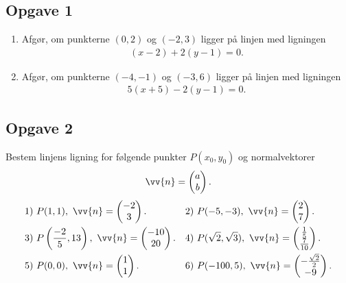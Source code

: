 \subsection*{Opgave 1}
\begin{enumerate}[label=\roman*)]
\item Afgør, om punkterne $(0,2)$ og $(-2,3)$ ligger på linjen med ligningen
\begin{align*}
	(x-2) + 2(y-1) = 0.
\end{align*}
\item Afgør, om punkterne $(-4,-1)$ og $(-3,6)$ ligger på linjen med ligningen 
\begin{align*}
	5(x+5) - 2(y-1) = 0.
\end{align*}
\end{enumerate}

\subsection*{Opgave 2}
Bestem linjens ligning for følgende punkter $P(x_0,y_0)$ og normalvektorer $$\vv{n} = \begin{pmatrix}
a \\ b
\end{pmatrix}.$$
\begin{align*}
&1) \ P(1,1), \ \vv{n} = \begin{pmatrix}
-2 \\ 3
\end{pmatrix}.   &&2) \ P(-5,-3), \ \vv{n} = \begin{pmatrix}
2 \\ 7
\end{pmatrix}.    \\
&3) \ P\left(\frac{-2}{5},13\right), \ \vv{n} = \begin{pmatrix}
-10 \\ 20
\end{pmatrix}.   &&4) \ P(\sqrt{2},\sqrt{3}), \ \vv{n} = \begin{pmatrix}
\frac{1}{5} \\ \frac{7}{10}
\end{pmatrix}.   \\
&5) \ P(0,0), \ \vv{n} = \begin{pmatrix}
1 \\ 1
\end{pmatrix}.   &&6) \ P(-100,5), \ \vv{n} = \begin{pmatrix}
-\frac{\sqrt{2}}{2} \\ -9
\end{pmatrix}.   \\
\end{align*}

